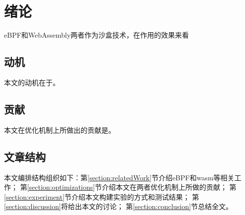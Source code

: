 \section{绪论}
    eBPF和WebAssembly两者作为沙盒技术，在作用的效果来看
\subsection{动机}
    本文的动机在于。
\subsection{贡献}
    本文在优化机制上所做出的贡献是。
\subsection{文章结构}
    本文编排结构组织如下：第\ref{section:relatedWork}节介绍eBPF和wasm等相关工作；
    第\ref{section:optimizations}节介绍本文在两者优化机制上所做的贡献；
    第\ref{section:experiment}节介绍本文构建实验的方式和测试结果；
    第\ref{section:discussion}将给出本文的讨论；
    第\ref{section:conclusion}节总结全文。

